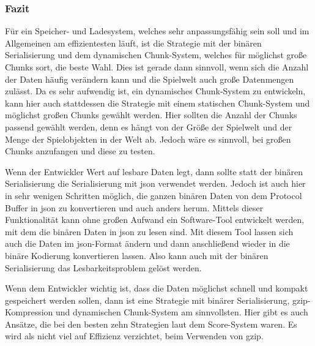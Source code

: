 \subsubsection{Fazit}
Für ein Speicher- und Ladesystem, welches sehr anpassungsfähig sein soll und im Allgemeinen am effizientesten läuft, ist die Strategie mit der binären Serialisierung und dem dynamischen Chunk-System, welches für möglichst große Chunks sort, die beste Wahl. Dies ist gerade dann sinnvoll, wenn sich die Anzahl der Daten häufig verändern kann und die Spielwelt auch große Datenmengen zulässt. Da es sehr aufwendig ist, ein dynamisches Chunk-System zu entwickeln, kann hier auch stattdessen die Strategie mit einem statischen Chunk-System und möglichst großen Chunks gewählt werden. Hier sollten die Anzahl der Chunks passend gewählt werden, denn es hängt von der Größe der Spielwelt und der Menge der Spielobjekten in der Welt ab. Jedoch wäre es sinnvoll, bei großen Chunks anzufangen und diese zu testen.    

Wenn der Entwickler Wert auf lesbare Daten legt, dann sollte statt der binären Serialisierung die Serialisierung mit \ac{json} verwendet werden. Jedoch ist auch hier in sehr wenigen Schritten möglich, die ganzen binären Daten von dem Protocol Buffer in \ac{json} zu konvertieren und auch anders herum.\cite{baeldungProtobufToJson} Mittels dieser Funktionalität kann ohne großen Aufwand ein Software-Tool entwickelt werden, mit dem die binären Daten in \ac{json} zu lesen sind. Mit diesem Tool lassen sich auch die Daten im \ac{json}-Format ändern und dann anschließend wieder in die binäre Kodierung konvertieren lassen. Also kann auch mit der binären Serialisierung das  Lesbarkeitsproblem gelöst werden.

Wenn dem Entwickler wichtig ist, dass die Daten möglichst schnell und kompakt gespeichert werden sollen, dann ist eine Strategie mit binärer Serialisierung, \ac{gzip}-Kompression und dynamischen Chunk-System am sinnvollsten. Hier gibt es auch Ansätze, die bei den besten zehn Strategien laut dem Score-System waren. Es wird als nicht viel auf Effizienz verzichtet, beim Verwenden von \ac{gzip}.